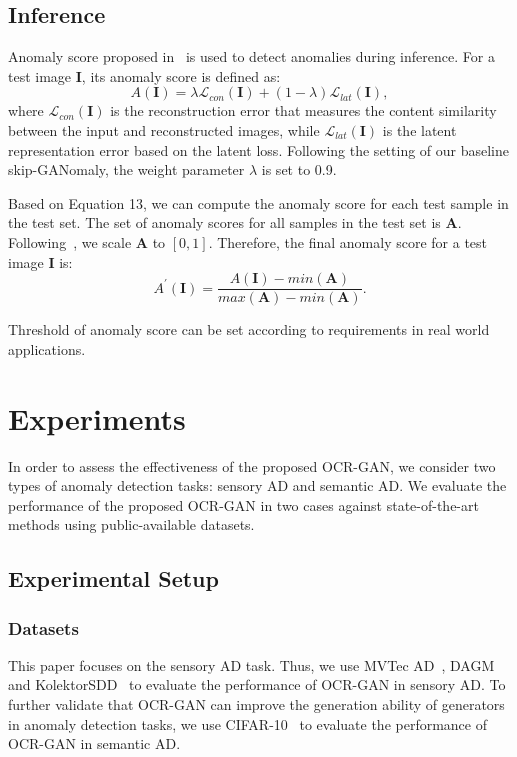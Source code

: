 \documentclass[lettersize,journal]{IEEEtran}
\begin{document}
\subsection{Inference}
Anomaly score proposed in~\cite{schlegl2017unsupervised} is used to detect anomalies during inference.
For a test image $\bm{I}$, its anomaly score is defined as:
\begin{equation}
    A(\bm{I}) = \lambda \mathcal{L}_{con}(\bm{I})+(1-\lambda) \mathcal{L}_{lat}(\bm{I}),
\end{equation}
where $\mathcal{L}_{con}(\bm{I})$ is the reconstruction error that measures the content similarity between the input and reconstructed images, while $\mathcal{L}_{lat}(\bm{I})$ is the latent representation error based on the latent loss. Following the setting of our baseline skip-GANomaly, the weight parameter $\lambda$ is set to 0.9.

Based on Equation 13, we can compute the anomaly score for each test sample in the test set. The set of anomaly scores for all samples in the test set is $\bm{A}$. Following~\cite{akccay2019skip}, we scale $\bm{A}$ to $[0,1]$. Therefore, the final anomaly score for a test image $\bm{I}$ is:
\begin{equation}
    A^{'}(\bm{I}) = \frac{A(\bm{I}) - min(\bm{A})}{max(\bm{A}) - min(\bm{A})}.
\end{equation}

Threshold of anomaly score can be set according to requirements in real world applications.

\section{Experiments}\label{sec:experiments}
In order to assess the effectiveness of the proposed OCR-GAN, we consider two types of anomaly detection tasks: sensory AD and semantic AD. We evaluate the performance of the proposed OCR-GAN in two cases against state-of-the-art methods using public-available datasets. 
\subsection{Experimental Setup}
\subsubsection{Datasets}
This paper focuses on the sensory AD task. Thus, we use MVTec AD~\cite{bergmann2019mvtec}, DAGM~\cite{wieler2007weakly} and KolektorSDD~\cite{Tabernik2019JIM} to evaluate the performance of OCR-GAN in sensory AD. To further validate that OCR-GAN can improve the generation ability of generators in anomaly detection tasks, we use CIFAR-10~\cite{krizhevsky2009learning} to evaluate the performance of OCR-GAN in semantic AD.
 
\end{document}
